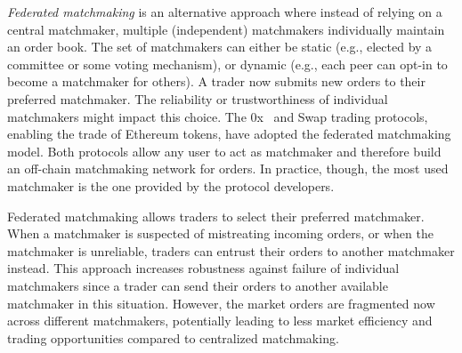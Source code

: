\emph{Federated matchmaking} is an alternative approach where instead of relying on a central matchmaker, multiple (independent) matchmakers individually maintain an order book.
The set of matchmakers can either be static (e.g., elected by a committee or some voting mechanism), or dynamic (e.g., each peer can opt-in to become a matchmaker for others).
A trader now submits new orders to their preferred matchmaker.
The reliability or trustworthiness of individual matchmakers might impact this choice.
The 0x~\cite{0x} and Swap trading protocols, enabling the trade of Ethereum tokens, have adopted the federated matchmaking model.
Both protocols allow any user to act as matchmaker and therefore build an off-chain matchmaking network for orders.
In practice, though, the most used matchmaker is the one provided by the protocol developers.



Federated matchmaking allows traders to select their preferred matchmaker.
When a matchmaker is suspected of mistreating incoming orders, or when the matchmaker is unreliable, traders can entrust their orders to another matchmaker instead.
This approach increases robustness against failure of individual matchmakers since a trader can send their orders to another available matchmaker in this situation.
However, the market orders are fragmented now across different matchmakers, potentially leading to less market efficiency and trading opportunities compared to centralized matchmaking.

